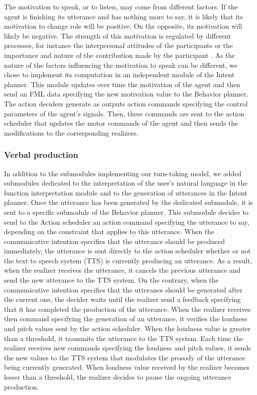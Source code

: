 The motivation to speak, or to listen, may come from different factors. If the agent is finishing its utterance and has nothing more to say, it is likely that its motivation to change role will be positive. On the opposite, its motivation will likely be negative. The strength of this motivation is regulated by different processes, for instance the interpersonal attitudes of the participants \citep{ter_maat_how_2010,ravenet_conversational_2015} or the importance and nature of the contribution made by the participant \citep{cafaro_effects_2016}. As the nature of the factors influencing the motivation to speak can be different, we chose to implement its computation in an independent module of the Intent planner. This module updates over time the motivation of the agent and then send an FML data specifying the new motivation value to the Behavior planner. 
The action deciders generate as outputs action commands specifying the control parameters of the agent's signals. Then, these commands are sent to the action scheduler that updates the motor commands of the agent and then sends the modifications to the corresponding realizers.

\subsubsection{Verbal production}

In addition to the submodules implementing our turn-taking model, we added submodules dedicated to the interpretation of the user's natural language in the function interpretation module and to the generation of utterances in the Intent planner. 
Once the utterance has been generated by the dedicated submodule, it is sent to a specific submodule of the Behavior planner. This submodule decides to send to the Action scheduler an action command specifying the utterance to say, depending on the constraint that applies to this utterance. When the communicative intention specifies that the utterance should be produced immediately, the utterance is sent directly to the action scheduler whether or not the text to speech system (TTS) is currently producing an utterance. As a result, when the realizer receives the utterance, it cancels the previous utterance and send the new utterance to the TTS system. On the contrary, when the communicative intention specifies that the utterance should be generated after the current one, the decider waits until the realizer send a feedback specifying that it has completed the production of the utterance.
When the realizer receives then command specifying the generation of an utterance, it verifies the loudness and pitch values sent by the action scheduler. When the loudness value is greater than a threshold, it transmits the utterance to the TTS system. Each time the realizer receives new commands specifying the loudness and pitch values, it sends the new values to the TTS system that modulates the prosody of the utterance being currently generated. When loudness value received by the realizer becomes lesser than a threshold, the realizer decides to pause the ongoing utterance production.

